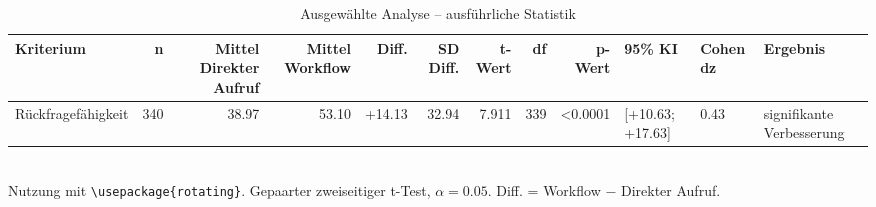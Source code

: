 \begin{table}
\centering
\caption{Ausgewählte Analyse -- ausführliche Statistik}
\begin{tabular}{lrrrrrrrrlll}
\toprule
Kriterium & n & Mittel Direkter Aufruf & Mittel Workflow & Diff. & SD Diff. & t-Wert & df & p-Wert & 95\% KI & Cohen dz & Ergebnis \\
\midrule
Rückfragefähigkeit & 340 & 38.97 & 53.10 & +14.13 & 32.94 & 7.911 & 339 & <0.0001 & [+10.63; +17.63] & 0.43 & signifikante Verbesserung \\
\bottomrule
\end{tabular}
\\[2mm]
\footnotesize Nutzung mit \texttt{\textbackslash usepackage\{rotating\}}. Gepaarter zweiseitiger t-Test, $\alpha=0.05$. Diff. = Workflow $-$ Direkter Aufruf.
\end{table}
